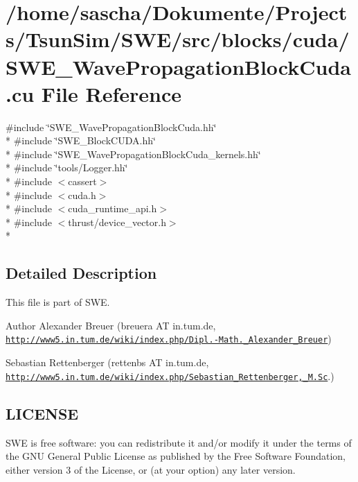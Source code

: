 \hypertarget{SWE__WavePropagationBlockCuda_8cu}{\section{/home/sascha/\-Dokumente/\-Projects/\-Tsun\-Sim/\-S\-W\-E/src/blocks/cuda/\-S\-W\-E\-\_\-\-Wave\-Propagation\-Block\-Cuda.cu File Reference}
\label{SWE__WavePropagationBlockCuda_8cu}
}
{\ttfamily \#include \char`\"{}S\-W\-E\-\_\-\-Wave\-Propagation\-Block\-Cuda.\-hh\char`\"{}}\\*
{\ttfamily \#include \char`\"{}S\-W\-E\-\_\-\-Block\-C\-U\-D\-A.\-hh\char`\"{}}\\*
{\ttfamily \#include \char`\"{}S\-W\-E\-\_\-\-Wave\-Propagation\-Block\-Cuda\-\_\-kernels.\-hh\char`\"{}}\\*
{\ttfamily \#include \char`\"{}tools/\-Logger.\-hh\char`\"{}}\\*
{\ttfamily \#include $<$cassert$>$}\\*
{\ttfamily \#include $<$cuda.\-h$>$}\\*
{\ttfamily \#include $<$cuda\-\_\-runtime\-\_\-api.\-h$>$}\\*
{\ttfamily \#include $<$thrust/device\-\_\-vector.\-h$>$}\\*


\subsection{Detailed Description}
This file is part of S\-W\-E.

\begin{DoxyAuthor}{Author}
Alexander Breuer (breuera A\-T in.\-tum.\-de, \href{http://www5.in.tum.de/wiki/index.php/Dipl.-Math._Alexander_Breuer}{\tt http\-://www5.\-in.\-tum.\-de/wiki/index.\-php/\-Dipl.-\/\-Math.\-\_\-\-Alexander\-\_\-\-Breuer}) 

Sebastian Rettenberger (rettenbs A\-T in.\-tum.\-de, \href{http://www5.in.tum.de/wiki/index.php/Sebastian_Rettenberger,_M.Sc}{\tt http\-://www5.\-in.\-tum.\-de/wiki/index.\-php/\-Sebastian\-\_\-\-Rettenberger,\-\_\-\-M.\-Sc}.)
\end{DoxyAuthor}
\hypertarget{Writer_8hh_LICENSE}{}\subsection{L\-I\-C\-E\-N\-S\-E}\label{Writer_8hh_LICENSE}
S\-W\-E is free software\-: you can redistribute it and/or modify it under the terms of the G\-N\-U General Public License as published by the Free Software Foundation, either version 3 of the License, or (at your option) any later version.

